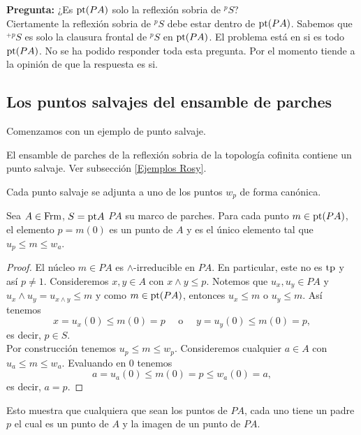 \textbf{Pregunta:} ¿Es $\mathrm{pt}(PA)$ solo la reflexión sobria de $^pS$?\\

Ciertamente la reflexión sobria de $^pS$ debe estar dentro de $\mathrm{pt}(PA)$. Sabemos que $^{+p}S$ es solo la clausura frontal de $^pS$ en $\mathrm{pt}(PA)$. El problema está en si es todo $\mathrm{pt}(PA)$. No se ha podido responder toda esta pregunta. Por el momento tiende a la opinión de que la respuesta es si.

\subsection{Los puntos salvajes del ensamble de parches}

Comenzamos con un ejemplo de punto salvaje.

\begin{ej}\label{Ejemplo9.4.1}
    El ensamble de parches de la reflexión sobria de la topología cofinita contiene un punto salvaje. Ver subsección \ref{Ejemplos Rosy}.
\end{ej}

Cada punto salvaje se adjunta a uno de los puntos $w_p$ de forma canónica.

\begin{lem}\label{Lema9.4.2}
    Sea $A\in \mathrm{Frm}$, $S=\mathrm{pt} A$ $PA$ su marco de parches. Para cada punto $m\in \mathrm{pt}(PA)$, el elemento $p=m(0)$ es un punto de $A$ y es el único elemento tal que $u_p\leq m\leq w_a$.
\end{lem}

\begin{proof}
    El núcleo $m\in PA$ es $\wedge$-irreducible en $PA$. En particular, este no es $\mathrm{tp}$ y así $p\neq 1$. Consideremos $x, y\in A$ con $x\wedge y\leq p$. Notemos que $u_x, u_y\in PA$ y $u_x\wedge u_y=u_{x\wedge y}\leq m$ y como $m\in \mathrm{pt}(PA)$, entonces $u_x\leq m$ o $u_y\leq m$. Así tenemos 
    \[
    x=u_x(0)\leq m(0)=p\quad\mbox{ o }\quad y=u_y(0)\leq m(0)=p,
    \]
    es decir, $p\in S$.\\

    Por construcción tenemos $u_p\leq m\leq w_p$. Consideremos cualquier $a\in A$ con $u_a\leq m\leq w_a$. Evaluando en $0$ tenemos
    \[
    a=u_a(0)\leq m(0)=p\leq w_a(0)=a,
    \]
    es decir, $a=p$.
\end{proof}

Esto muestra que cualquiera que sean los puntos de $PA$, cada uno tiene un padre $p$ el cual es un punto de $A$ y la imagen de un punto de $PA$.\\

